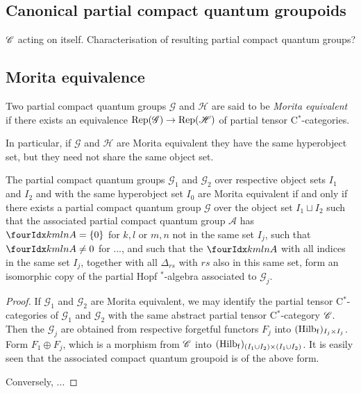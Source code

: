 \subsection{Canonical partial compact quantum groupoids}

$\mathscr{C}$ acting on itself. Characterisation of resulting partial compact quantum groups? 

\subsection{Morita equivalence}


\begin{Def} Two partial compact quantum groups $\mathscr{G}$ and $\mathscr{H}$ are said to be \emph{Morita equivalent} if there exists an equivalence $\mathrm{Rep}(\mathscr{G}) \rightarrow \mathrm{Rep}(\mathscr{H})$ of partial tensor C$^*$-categories. %
\end{Def} 

In particular, if $\mathscr{G}$ and $\mathscr{H}$ are Morita equivalent they have the same hyperobject set, but they need not share the same object set.

\begin{Prop} The partial compact quantum groups $\mathscr{G}_1$ and $\mathscr{G}_2$ over respective object sets $I_1$ and $I_2$ and with the same hyperobject set $I_0$ are Morita equivalent if and only if there exists a partial compact quantum group $\mathscr{G}$ over the object set $I_1\sqcup I_2$ such that the associated partial compact quantum group $\mathscr{A}$ has $\Gr{A}{k}{l}{m}{n}=\{0\}$ for $k,l$ or $m,n$ not in the same set $I_j$, such that $\Gr{A}{k}{l}{m}{n}\neq 0$ for ..., and such that the $\Gr{A}{k}{l}{m}{n}$ with all indices in the same set $I_j$, together with all $\Delta_{rs}$ with $rs$ also in this same set, form an isomorphic copy of the partial Hopf $^*$-algebra associated to $\mathscr{G}_j$. %
\end{Prop}
\begin{proof} If $\mathscr{G}_1$ and $\mathscr{G}_2$ are Morita equivalent, we may identify the partial tensor C$^*$-categories of $\mathscr{G}_1$ and $\mathscr{G}_2$ with the same abstract partial tensor C$^*$-category $\mathscr{C}$. Then the $\mathscr{G}_j$ are obtained from respective forgetful functors $F_j$ into $(\mathrm{Hilb}_{\operatorname{\mathrm{f}}})_{I_j\times I_j}$. Form $F_1\oplus F_j$, which is a morphism from $\mathscr{C}$ into $(\mathrm{Hilb}_{\operatorname{\mathrm{f}}})_{(I_1\cup I_2)\times (I_1\cup I_2)}$. It is easily seen that the associated compact quantum groupoid is of the above form.

Conversely, ...
\end{proof} 

